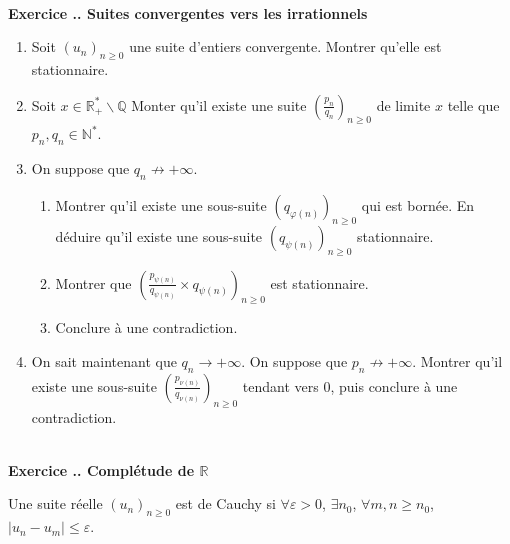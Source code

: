 \documentclass{article}
\newcommand{\mb}[1]{\mathbb{#1}}
\newcounter{exo}
\newcommand{\exercice}[1][\null]{\textbf{\\ Exercice \thesection.\theexo. #1} \addtocounter{exo}{1}}
\begin{document}
\exercice[Suites convergentes vers les irrationnels]

\begin{enumerate}

\item Soit $(u_n)_{n \ge 0}$ une suite d'entiers convergente. Montrer qu'elle est stationnaire.

\item Soit $x\in \mb{R}^*_+ \smallsetminus \mb{Q}$ Monter qu'il existe une suite $\left(\frac{p_n}{q_n}\right)_{n \ge 0}$ de limite $x$ telle que $p_n, q_n \in \mb{N}^*$.

\item On suppose que $q_n \not \rightarrow + \infty$.

\begin{enumerate}

\item Montrer qu'il existe une sous-suite $(q_{\varphi(n)})_{n \ge 0}$ qui est bornée. En déduire qu'il existe une sous-suite $(q_{\psi(n)})_{n \ge 0}$ stationnaire.

\item Montrer que $\left(\frac{p_{\psi(n)}}{q_{\psi(n)}} \times q_{\psi(n)}\right)_{n \ge 0}$ est stationnaire.

\item Conclure à une contradiction.
\end{enumerate}

\item On sait maintenant que $q_n \to + \infty$. On suppose que $p_n \not \rightarrow + \infty$. Montrer qu'il existe une sous-suite $\left(\frac{p_{\nu(n)}}{q_{\nu(n)}}\right)_{n \ge 0}$ tendant vers $0$, puis conclure à une contradiction.

\end{enumerate}






\exercice[Complétude de $\mb{R}$]

Une suite réelle $(u_n)_{n \ge 0}$ est de Cauchy si $\forall \varepsilon >0$, $\exists n_0$, $\forall m,n \ge n_0$, $|u_n - u_m | \le \varepsilon$.
\end{document}
